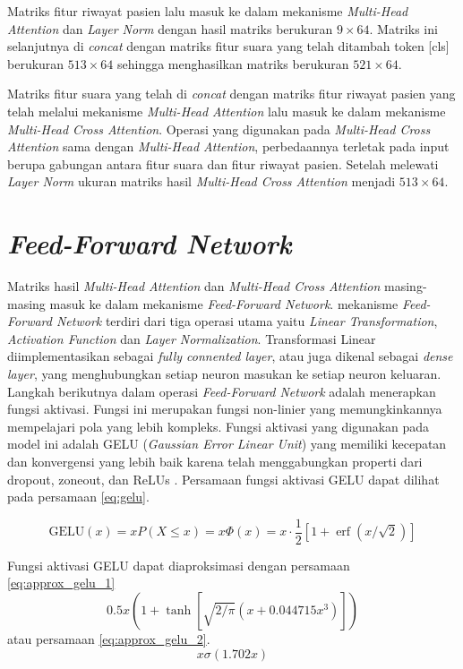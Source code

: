 Matriks fitur riwayat pasien lalu masuk ke dalam mekanisme \textit{Multi-Head Attention} dan \textit{Layer Norm} dengan hasil matriks berukuran $9\times64$. Matriks ini selanjutnya di \textit{concat} dengan matriks fitur suara yang telah ditambah token [cls] berukuran $513\times64$ sehingga menghasilkan matriks berukuran $521\times64$.

Matriks fitur suara yang telah di \textit{concat} dengan matriks fitur riwayat pasien yang telah melalui mekanisme \textit{Multi-Head Attention} lalu masuk ke dalam mekanisme \textit{Multi-Head Cross Attention}. Operasi yang digunakan pada \textit{Multi-Head Cross Attention} sama dengan \textit{Multi-Head Attention}, perbedaannya terletak pada input berupa gabungan antara fitur suara dan fitur riwayat pasien. Setelah melewati \textit{Layer Norm} ukuran matriks hasil \textit{Multi-Head Cross Attention} menjadi $513\times64$.

\section{\textit{Feed-Forward Network}}
Matriks hasil \textit{Multi-Head Attention} dan \textit{Multi-Head Cross Attention} masing-masing masuk ke dalam mekanisme \textit{Feed-Forward Network}. mekanisme \textit{Feed-Forward Network} terdiri dari tiga operasi utama yaitu \textit{Linear Transformation}, \textit{Activation Function} dan \textit{Layer Normalization}. Transformasi Linear diimplementasikan sebagai \textit{fully connented layer}, atau juga dikenal sebagai \textit{dense layer}, yang menghubungkan setiap neuron masukan ke setiap neuron keluaran. Langkah berikutnya dalam operasi \textit{Feed-Forward Network} adalah menerapkan fungsi aktivasi. Fungsi ini merupakan fungsi non-linier yang memungkinkannya mempelajari pola yang lebih kompleks. Fungsi aktivasi yang digunakan pada model ini adalah GELU (\textit{Gaussian Error  Linear Unit}) yang memiliki kecepatan dan konvergensi yang lebih baik karena telah menggabungkan properti dari dropout, zoneout, dan ReLUs \cite{hendrycks2023gaussianerrorlinearunits}. Persamaan fungsi aktivasi GELU dapat dilihat pada persamaan \ref{eq:gelu}.

\begin{equation}
    \text{GELU}(x) = x P(X \leq x) = x \Phi(x) = x \cdot \frac{1}{2} \left[ 1 + \operatorname{erf}(x / \sqrt{2}) \right]
    \label{eq:gelu}
\end{equation}

Fungsi aktivasi GELU dapat diaproksimasi dengan persamaan \ref{eq:approx_gelu_1}
\begin{equation}
    0.5x(1 + \tanh[\sqrt{2/\pi}(x + 0.044715x^3)])
    \label{eq:approx_gelu_1}
\end{equation}
atau persamaan \ref{eq:approx_gelu_2}.
\begin{equation}
    x\sigma(1.702x)
    \label{eq:approx_gelu_2}
\end{equation}

